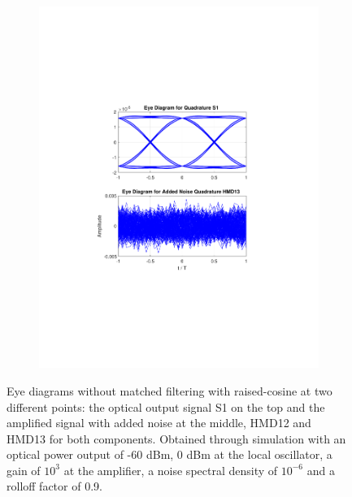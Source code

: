 \begin{figure}[H]
\begin{subfigure}{.45\textwidth}
		\includegraphics[clip, trim=5cm 4cm 5cm 4cm, width=\textwidth]{./sdf/m_qam_system/figures/eyes/q_n_nmf_60_60_rc_09.pdf}
	\end{subfigure}
	
	\caption{Eye diagrams without matched filtering with raised-cosine at
		two different points: the optical output signal S1 on the top and the amplified
		signal with added noise at the middle, HMD12 and HMD13 for both
		components. Obtained through simulation with an optical power output of -60
		dBm, 0 dBm at the local oscillator, a gain of $10^3$ at the amplifier, a noise
		spectral density of $10^{-6}$ and a rolloff factor of
		0.9.\label{fig:eyes_n_rc_60_09}}
\end{figure}


